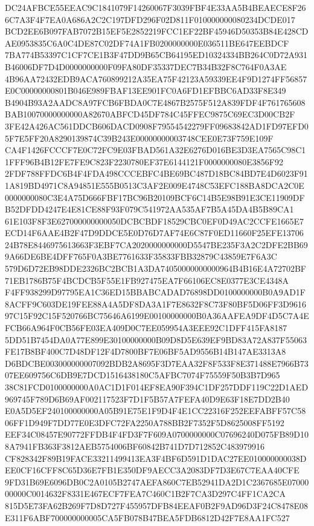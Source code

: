 \documentclass[UTF8,fontset=fandol,zihao=-4,a4paper]{ctexart}
\begin{document}
{{DC24AFBCE55EEAC9C1841079F14260067F3039FBF4E33AA5B4BEAECE8F266C7A3F4F7EA0A686A2C2C197DFD296F02D811F010000000080234DCDE017
BCD2EE6B097FAB7072B15EF5E2852219FCC1EF22BF45946D50353B84E428CDAE0953835C6A0C4DE87C02DF74A1FB0200000000E036511BE647EEBDCF
7BA774B53397C1CF7CE1B3F47DD9B65CB64195ED10324334BB264C0D72A931B46006DF7D4D0000000000F09FA80DF35337DEC7B34B32F8C764F0A3AE
4B96AA72432EDB9ACA760899212A35EA75F42123A59339EE4F9D1274FF56857E0C00000000801B046E989FBAF13EE901FC0A6FD1EFBBC6AD33F8E349
B4904B93A2AADC8A97FCB6FBDA0C7E4867B2575F512A839FDF4F761765608BAB10070000000000A82670ABFCD45DF784C45FFEC9875C69EC3D00CB2F
3FE42A426AC561DDCB606DACD0908F79554542279FF09683842AD1FD97EFD05F7E5FF20A8290139874C39B243E00000000003748CEE0E73F759E109F
CA4F1426FCCCF7E0C72FC9E03FBAD561A32E6276D016BE3D3EA7565C98C11FFF96B4B12FE7FE9C823F2230780EF37E6144121F0000000080E3856F92
2FDF788FFDC6B4F4FDA498CCCEBFC4BE69BC487D18BC84BD7E4D6023F911A819BD4971C8A94851E555B0513C3AF2E009E4748C53EFC188BA8DCA2C0E
0000000080C3E4A75D666FBF17BC96B20109BCF6C14B5E98B91E3CE11909DFB52DFDD4247E4E81CE88F93F079C541972AA535AF7B5A45DA4B5B89CA1
61E103F8F3E627000000000050DCBCBDF18529CBC0EF0D49AC2CCFE1665E7ECD14F6AAE4B2F47D9DDCE5E0D76D7AF74E6C87F0ED11660F25EFE13706
24B78E8446975613663F3EBF7CA2020000000000D5547BE235F3A2C2DFE2BB699A66DE6BE4DFF765F0A3BE7761633F35833FBB32879C43859E7F6A3C
579D6D72EB98DDE2326BC2BCB1A3DA74050000000000964B4B16E4A72702BF71EB1786B75F4BCDCB5F55E1FB927475EA7F66106EC8E0377E3CE4348A
F4FF938299D97795EA1C36ED15BBABCADAD76898DD0100000000B0A9AD1F8ACFF9C603DE19FEE88A4A5DF8DA3A1F7E8632F8C73F80BF5D06FF3D9616
97C15F92C15F520766BC75646A6199E00100000000B0A36AAFEA9DF4D5C7A4EFCB66A964F0CB56FE03EA409D0C7EE059954A3EEE92C1DFF415FA8187
5DD51B7454DA0A77E899E30100000000B09D8D5E639EF9BD83A72A837F55063FE17B8BF400C7D48DF12F4D7800BF7E06BF5AD9556B14B147AE3313A8
D6BDCBE003000000007092BDB2A8695F3D7EAA32F8F533F8E371488E7966B7307EE609756C6DB9E7DCD1516438180C5AFBC7074F75559F50B3B7D965
38C81FCD0100000000A0AC1D1F014EF8EA90F394C1DF257DDF119C22D1AED969745F789D6B69AF002117523F7D1F5B57A7FEFA40D9E63F18E7DD2B40
E0A5D5EF240100000000A05B91E75E1F9D4F4E1CC22316F252EEFABFF57C5806FF1D949F7DD77E0E3DFC72FA2250A788BB2F7352F5D8625008FF5192
EEF34C08457E90772FFDB4F4FD3F7F609A0700000000C07696240D075FB89D108A7941FB363F3812AEB5754006BF60842B741D7D712852C483979916
CF828342F89B19FACE33211499413EA3F4BF6D591D1DAC27EE010000000038DEE0CF16CFF8C65D36E7FB1E350DF9AECC3A2083DF7D3E67C7EAA40CFE
9FD31B69E6096DB0C2A0105B2747AEFA860C7EB52941DA2D1C2367685E0700000000C0014632F8331E467ECF7FEA7C460C1B2F7CA3D297C4FF1CA2CA
815D5E73FA62B269F7D8D727F455957DFB84EEAF0B2F9AD96D3F24C8478E08E311F6ABF700000000005CA5FB078B47BEA5FDB6812D42F7E8AA1FC527
}}
\end{document}
